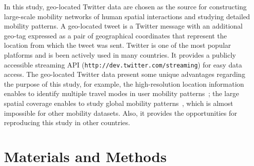 \documentclass[]{tGIS2e}
\begin{document}
In this study, geo-located Twitter data are chosen as the source for constructing large-scale mobility networks of human spatial interactions and studying detailed mobility patterns.
A geo-located tweet is a Twitter message with an additional geo-tag expressed as a pair of geographical coordinates that represent the location from which the tweet was sent.
Twitter is one of the most popular platforms and is been actively used in many countries. 
It provides a publicly accessible streaming API ({\tt{http://dev.twitter.com/streaming}}) for easy data access.
The geo-located Twitter data present some unique advantages regarding the purpose of this study, for example, the high-resolution location information enables to identify multiple travel modes in user mobility patterns~\citep{jurdak2015}; the large spatial coverage enables to study global mobility patterns~\citep{hawelka}, which is almost impossible for other mobility datasets. Also, it provides the opportunities for reproducing this study in other countries.

\section{Materials and Methods}
%
\end{document}
